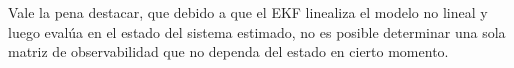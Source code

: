 \begin{comment}
Donde,
\begin{equation*}
\begin{array}{rl}
	\mF_{1,3}(\x,k)&=- \DeltaT v_k \sin(\phi_k + \theta_k + s_k) - \frac{1}{2}\DeltaT^2\dot{\theta}_k v_k\cos(\phi_k + \theta_k + s_k)\\
	\mF_{1,4}(\x,k)&=-\frac{1}{2}\DeltaT^2 v_k\sin(\phi_k + \theta_k + s_k)\\
	\mF_{1,5}(\x,k)&= \DeltaT\cos(\phi_k + \theta_k + s_k) - \frac{1}{2}\DeltaT^2\dot{\theta}_k\sin(\phi_k + \theta_k + s_k)\\
	\mF_{1,6}(\x,k)&=- \DeltaT v_k \sin(\phi_k + \theta_k + s_k)  - \frac{1}{2}\DeltaT^2\dot{\theta}_k v_k\cos(\phi_k + \theta_k + s_k)\\
	\mF_{1,7}(\x,k)&= - \DeltaT v_k \sin(\phi_k + \theta_k + s_k) - \frac{1}{2}\DeltaT^2\dot{\theta}_k v_k\cos(\phi_k + \theta_k + s_k)\\
	\mF_{2,3}(\x,k)&= \DeltaT v_k \cos(\phi_k + \theta_k + s_k) - \frac{1}{2}\DeltaT^2\dot{\theta}_k v_k\sin(\phi_k + \theta_k + s_k)\\
	\mF_{2,4}(\x,k)&=\frac{1}{2}\DeltaT^2 v_k\cos(\phi_k + \theta_k + s_k)\\
	\mF_{2,5}(\x,k)&=\frac{1}{2}\DeltaT^2 \dot{\theta}_k \cos(\phi_k + \theta_k + s_k)  + \DeltaT\sin(\phi_k + \theta_k + s_k)\\
	\mF_{2,6}(\x,k)&=\DeltaT v_k \cos(\phi_k + \theta_k + s_k) - \frac{1}{2}\DeltaT^2\dot{\theta}_k v_k\sin(\phi_k + \theta_k + s_k)\\
	\mF_{2,7}(\x,k)&=  \DeltaT v_k \cos(\phi_k + \theta_k + s_k) - \frac{1}{2}\DeltaT^2\dot{\theta}_k v_k\sin(\phi_k + \theta_k + s_k)
\end{array}
\end{equation*}

\end{comment}

Vale la pena destacar, que debido a que el EKF linealiza el modelo no lineal y luego evalúa en el estado del sistema estimado,
no es posible determinar una sola matriz de observabilidad que no dependa del estado en cierto momento.